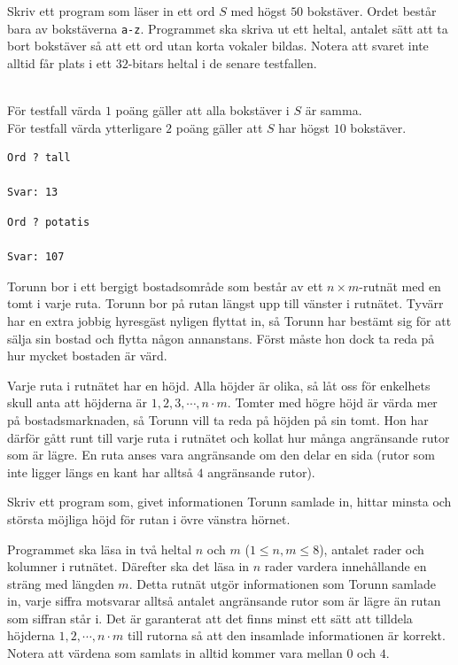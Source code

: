 Skriv ett program som läser in ett ord $S$ med högst $50$ bokstäver. Ordet består bara av bokstäverna \texttt{a-z}. Programmet ska skriva ut ett heltal, antalet sätt att ta bort bokstäver så att ett ord utan korta vokaler bildas. Notera att svaret inte alltid får plats i ett $32$-bitars heltal i de senare testfallen.

\\
För testfall värda $1$ poäng gäller att alla bokstäver i $S$ är samma.\\
För testfall värda ytterligare $2$ poäng gäller att $S$ har högst $10$ bokstäver.


\vspace{1cm}

\begin{verbatim}
Ord ? tall

Svar: 13
\end{verbatim}

\vspace{1cm}

\begin{verbatim}
Ord ? potatis

Svar: 107
\end{verbatim}


\newpage
{}


\noindent
Torunn bor i ett bergigt bostadsområde som består av ett $n \times m$-rutnät med en tomt i varje ruta.
Torunn bor på rutan längst upp till vänster i rutnätet.
Tyvärr har en extra jobbig hyresgäst nyligen flyttat in, så Torunn har bestämt sig för att sälja sin bostad och flytta någon annanstans.
Först måste hon dock ta reda på hur mycket bostaden är värd.

Varje ruta i rutnätet har en höjd. Alla höjder är olika, så låt oss för enkelhets skull anta att höjderna är $1, 2, 3, \cdots, n\cdot m$.
Tomter med högre höjd är värda mer på bostadsmarknaden, så Torunn vill ta reda på höjden på sin tomt. Hon har därför gått runt till varje ruta i rutnätet och kollat hur många angränsande rutor som är lägre.
En ruta anses vara angränsande om den delar en sida (rutor som inte ligger längs en kant har alltså $4$ angränsande rutor).

Skriv ett program som, givet informationen Torunn samlade in, hittar minsta och största möjliga höjd för rutan i övre vänstra hörnet.

Programmet ska läsa in två heltal $n$ och $m$ ($1 \leq n,m \leq 8$), antalet rader och kolumner i
rutnätet. Därefter ska det läsa in $n$ rader vardera innehållande en sträng med längden $m$. Detta rutnät utgör informationen
som Torunn samlade in, varje siffra motsvarar alltså antalet angränsande rutor som är lägre än rutan som
siffran står i. Det är garanterat att det finns minst ett sätt att tilldela höjderna 
$1, 2, \cdots, n\cdot m$ till rutorna så att den insamlade informationen är korrekt. Notera att värdena
som samlats in alltid kommer vara mellan $0$ och $4$.

